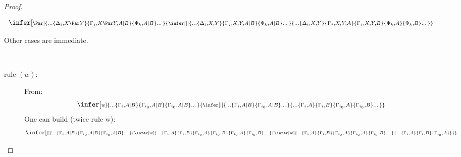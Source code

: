 \documentclass{llncs}
\def\scriptInfer[#1]#2#3{\infer[\scriptstyle #1]{\scriptstyle #2}{\scriptstyle #3}}\def\scriptInferD#1#2{\infer{\scriptstyle #1}{\scriptstyle #2}}
\newcommand{\cpar}{\mid}
\begin{document}
\begin{proof}
\begin{description}
\begin{description}
          $$\scriptInfer[\Par]{\dots \{\Delta_i, X\Par Y\} 
                                \{\Gamma_j, X\Par Y, A\cpar B\}
                                \{\Phi_k, A\cpar B\} \dots}
                  {\scriptInfer[\cpar]{\dots \{\Delta_i, X, Y\} 
                                \{\Gamma_j, X, Y, A\cpar B\}
                                \{\Phi_k, A\cpar B\} \dots}
                         {\dots \{\Delta_i, X, Y\} 
                                \{\Gamma_j, X, Y, A\}
                                \{\Gamma_j, X, Y, B\} 
                                \{\Phi_k, A\} 
                                \{\Phi_k, B\} \dots}
                  }
          $$      
     \item[Other rules: ] Other cases are immediate.
     \end{description}
\item[\fbox{case $\cpar$}] \ \\
     \begin{description}
     \item[rule $(w)$: ] From:
          $$\scriptInfer[w]{\dots \{\Gamma_i, A\cpar B\}
                            \{\Gamma_{i_0}, A\cpar B\}
                            \{\Gamma_{i_0}, A\cpar B\} \dots}
                  {\scriptInfer[\cpar]{\dots \{\Gamma_i, A\cpar B\}
                                       \{\Gamma_{i_0}, A\cpar B\} \dots}
                         {\dots \{\Gamma_i, A\}
                                \{\Gamma_i, B\}
                                \{\Gamma_{i_0}, A\}
                                \{\Gamma_{i_0}, B\} \dots}
                  }
          $$
          One can build (twice rule w):
          $$\scriptInfer[\cpar]{\dots \{\Gamma_i, A\cpar B\}
                            \{\Gamma_{i_0}, A\cpar B\}
                            \{\Gamma_{i_0}, A\cpar B\} \dots}
                  {\scriptInfer[w]{\dots \{\Gamma_i, A\}
                                   \{\Gamma_i, B\}
                                   \{\Gamma_{i_0}, A\}
                                   \{\Gamma_{i_0}, B\}
                                   \{\Gamma_{i_0}, A\}
                                   \{\Gamma_{i_0}, B\} \dots}
                         {\scriptInfer[w]{\dots \{\Gamma_i, A\}
                                   \{\Gamma_i, B\}
                                   \{\Gamma_{i_0}, A\}
                                   \{\Gamma_{i_0}, A\}
                                   \{\Gamma_{i_0}, B\} \dots}
                         {\dots \{\Gamma_i, A\}
                                \{\Gamma_i, B\}
                                \{\Gamma_{i_0}, A\}
}}}$$
\end{description}
\end{description}
\end{proof}
\end{document}
